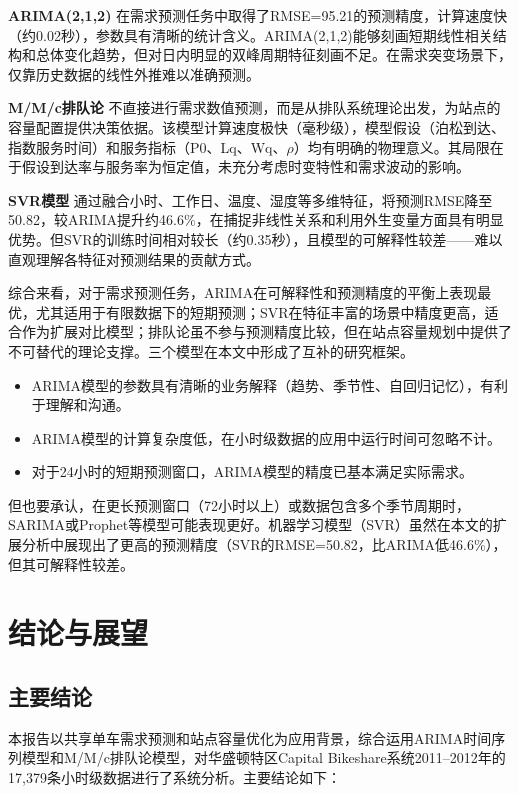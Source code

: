 \documentclass[12pt,a4paper]{article}
\begin{document}
\textbf{ARIMA(2,1,2)} 在需求预测任务中取得了RMSE=95.21的预测精度，计算速度快（约0.02秒），参数具有清晰的统计含义。ARIMA(2,1,2)能够刻画短期线性相关结构和总体变化趋势，但对日内明显的双峰周期特征刻画不足。在需求突变场景下，仅靠历史数据的线性外推难以准确预测。

\textbf{M/M/c排队论} 不直接进行需求数值预测，而是从排队系统理论出发，为站点的容量配置提供决策依据。该模型计算速度极快（毫秒级），模型假设（泊松到达、指数服务时间）和服务指标（P0、Lq、Wq、$\rho$）均有明确的物理意义。其局限在于假设到达率与服务率为恒定值，未充分考虑时变特性和需求波动的影响。

\textbf{SVR模型} 通过融合小时、工作日、温度、湿度等多维特征，将预测RMSE降至50.82，较ARIMA提升约46.6\%，在捕捉非线性关系和利用外生变量方面具有明显优势。但SVR的训练时间相对较长（约0.35秒），且模型的可解释性较差——难以直观理解各特征对预测结果的贡献方式。

综合来看，对于需求预测任务，ARIMA在可解释性和预测精度的平衡上表现最优，尤其适用于有限数据下的短期预测；SVR在特征丰富的场景中精度更高，适合作为扩展对比模型；排队论虽不参与预测精度比较，但在站点容量规划中提供了不可替代的理论支撑。三个模型在本文中形成了互补的研究框架。

\begin{itemize}
  \item ARIMA模型的参数具有清晰的业务解释（趋势、季节性、自回归记忆），有利于理解和沟通。
  \item ARIMA模型的计算复杂度低，在小时级数据的应用中运行时间可忽略不计。
  \item 对于24小时的短期预测窗口，ARIMA模型的精度已基本满足实际需求。
\end{itemize}

但也要承认，在更长预测窗口（72小时以上）或数据包含多个季节周期时，SARIMA或Prophet等模型可能表现更好。机器学习模型（SVR）虽然在本文的扩展分析中展现出了更高的预测精度（SVR的RMSE=50.82，比ARIMA低46.6\%），但其可解释性较差。

\section{结论与展望}

\subsection{主要结论}

本报告以共享单车需求预测和站点容量优化为应用背景，综合运用ARIMA时间序列模型和M/M/c排队论模型，对华盛顿特区Capital Bikeshare系统2011--2012年的17,379条小时级数据进行了系统分析。主要结论如下：
\end{document}

